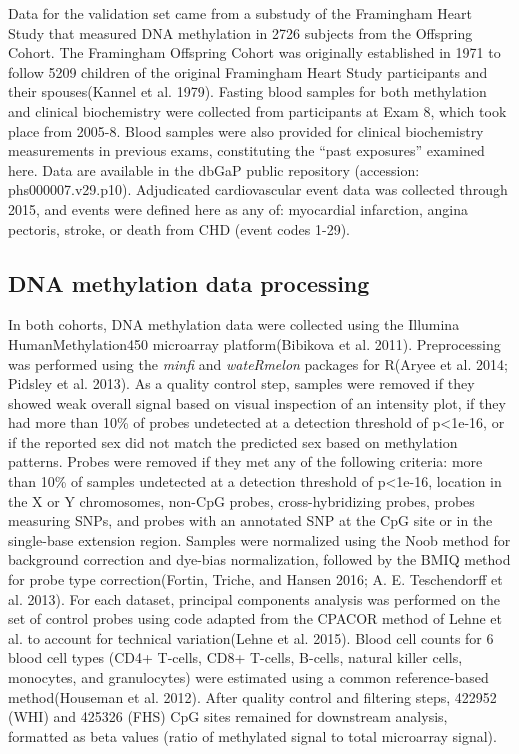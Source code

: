 \documentclass[]{article}
\theoremstyle{definition}
\theoremstyle{definition}
\theoremstyle{definition}
\theoremstyle{remark}
\begin{document}
Data for the validation set came from a substudy of the Framingham Heart
Study that measured DNA methylation in 2726 subjects from the Offspring
Cohort. The Framingham Offspring Cohort was originally established in
1971 to follow 5209 children of the original Framingham Heart Study
participants and their spouses(Kannel et al. 1979). Fasting blood
samples for both methylation and clinical biochemistry were collected
from participants at Exam 8, which took place from 2005-8. Blood samples
were also provided for clinical biochemistry measurements in previous
exams, constituting the ``past exposures'' examined here. Data are
available in the dbGaP public repository (accession: phs000007.v29.p10).
Adjudicated cardiovascular event data was collected through 2015, and
events were defined here as any of: myocardial infarction, angina
pectoris, stroke, or death from CHD (event codes 1-29).

\subsection{DNA methylation data
processing}\label{dna-methylation-data-processing}

In both cohorts, DNA methylation data were collected using the Illumina
HumanMethylation450 microarray platform(Bibikova et al. 2011).
Preprocessing was performed using the \emph{minfi} and \emph{wateRmelon}
packages for R(Aryee et al. 2014; Pidsley et al. 2013). As a quality
control step, samples were removed if they showed weak overall signal
based on visual inspection of an intensity plot, if they had more than
10\% of probes undetected at a detection threshold of p\textless{}1e-16,
or if the reported sex did not match the predicted sex based on
methylation patterns. Probes were removed if they met any of the
following criteria: more than 10\% of samples undetected at a detection
threshold of p\textless{}1e-16, location in the X or Y chromosomes,
non-CpG probes, cross-hybridizing probes, probes measuring SNPs, and
probes with an annotated SNP at the CpG site or in the single-base
extension region. Samples were normalized using the Noob method for
background correction and dye-bias normalization, followed by the BMIQ
method for probe type correction(Fortin, Triche, and Hansen 2016; A. E.
Teschendorff et al. 2013). For each dataset, principal components
analysis was performed on the set of control probes using code adapted
from the CPACOR method of Lehne et al. to account for technical
variation(Lehne et al. 2015). Blood cell counts for 6 blood cell types
(CD4+ T-cells, CD8+ T-cells, B-cells, natural killer cells, monocytes,
and granulocytes) were estimated using a common reference-based
method(Houseman et al. 2012). After quality control and filtering steps,
422952 (WHI) and 425326 (FHS) CpG sites remained for downstream
analysis, formatted as beta values (ratio of methylated signal to total
microarray signal).
\end{document}
